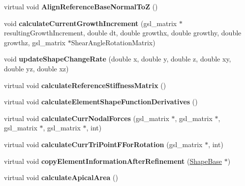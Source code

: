 \begin{DoxyCompactItemize}
\item 
\hypertarget{classShapeBase_a362a15361e6fd25d65ed05f0cc31737a}{}virtual void {\bfseries Align\+Reference\+Base\+Normal\+To\+Z} ()\label{classShapeBase_a362a15361e6fd25d65ed05f0cc31737a}

\item 
\hypertarget{classShapeBase_ac2c05f660fb3d68482c8ba751b68b2ed}{}void {\bfseries calculate\+Current\+Growth\+Increment} (gsl\+\_\+matrix $\ast$resulting\+Growth\+Increment, double dt, double growthx, double growthy, double growthz, gsl\+\_\+matrix $\ast$Shear\+Angle\+Rotation\+Matrix)\label{classShapeBase_ac2c05f660fb3d68482c8ba751b68b2ed}

\item 
\hypertarget{classShapeBase_a227d409b04d95e3110db851a9cb3ed8c}{}void {\bfseries update\+Shape\+Change\+Rate} (double x, double y, double z, double xy, double yz, double xz)\label{classShapeBase_a227d409b04d95e3110db851a9cb3ed8c}

\item 
\hypertarget{classShapeBase_a1162e815f80b1b9d58c69df731702ecb}{}virtual void {\bfseries calculate\+Reference\+Stiffness\+Matrix} ()\label{classShapeBase_a1162e815f80b1b9d58c69df731702ecb}

\item 
\hypertarget{classShapeBase_ab86b6c4eef2ea6232dd1d0c300ae5602}{}virtual void {\bfseries calculate\+Element\+Shape\+Function\+Derivatives} ()\label{classShapeBase_ab86b6c4eef2ea6232dd1d0c300ae5602}

\item 
\hypertarget{classShapeBase_acca6ea9484bbc995d941f1a7bb25e1db}{}virtual void {\bfseries calculate\+Curr\+Nodal\+Forces} (gsl\+\_\+matrix $\ast$, gsl\+\_\+matrix $\ast$, gsl\+\_\+matrix $\ast$, gsl\+\_\+matrix $\ast$, int)\label{classShapeBase_acca6ea9484bbc995d941f1a7bb25e1db}

\item 
\hypertarget{classShapeBase_a9c1dc3dcba4b76026ce83fb7b78c0831}{}virtual void {\bfseries calculate\+Curr\+Tri\+Point\+F\+For\+Rotation} (gsl\+\_\+matrix $\ast$, int)\label{classShapeBase_a9c1dc3dcba4b76026ce83fb7b78c0831}

\item 
\hypertarget{classShapeBase_a8e96ca0cb1147c06913b5808843d3564}{}virtual void {\bfseries copy\+Element\+Information\+After\+Refinement} (\hyperlink{classShapeBase}{Shape\+Base} $\ast$)\label{classShapeBase_a8e96ca0cb1147c06913b5808843d3564}

\item 
\hypertarget{classShapeBase_a010092ac7af5667facbbb8fb6bd98976}{}virtual void {\bfseries calculate\+Apical\+Area} ()\label{classShapeBase_a010092ac7af5667facbbb8fb6bd98976}


\end{DoxyCompactItemize}
